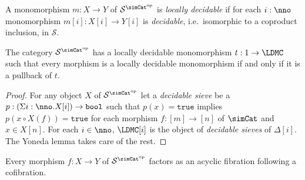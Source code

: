 \documentclass{tac}
\newcommand\cat\mathcal
\newcommand\dual{^{\mathrm{op}}}
\newcommand\s{^{\simCat\dual}}
\newcommand\of{:}
\newcommand\simplex\Delta
\newcommand\true{\mathtt{true}}
\newcommand\bool{\mathtt{bool}}
\begin{document}
\begin{definition} A monomorphism $m\of X\to Y$ of $\cat S\s$ is \emph{locally decidable} if for each $i\of\nno$ monomorphism $m[i]\of X[i]\to Y[i]$ is \emph{decidable}, i.e.\ isomorphic to a coproduct inclusion, in $\cat S$. \end{definition}


\begin{lemma} The category $\cat S\s$ has a locally decidable monomorphism $t\of 1\to \LDMC$ such that every morphism is a locally decidable monomorphism if and only if it is a pullback of $t$. \end{lemma}

\begin{proof} For any object $X$ of $\cat S\s$ let a \emph{decidable sieve} be a $p\of(\Sigma i\of\nno.X[i])\to\bool$ such that $p(x)=\true$ implies $p(x\circ X(f))=\true$ for each morphism $f\of [m]\to [n]$ of $\simCat$ and $x\in X[n]$. For each $i\in\nno$, $\LDMC[i]$ is the object of \emph{decidable sieves} of $\simplex[i]$. The Yoneda lemma takes care of the rest. \end{proof}

\begin{proposition} Every morphism $f\of X\to Y$ of $\cat S\s$ factors as an acyclic fibration following a cofibration. \label{factor1} \end{proposition}
\end{document}
